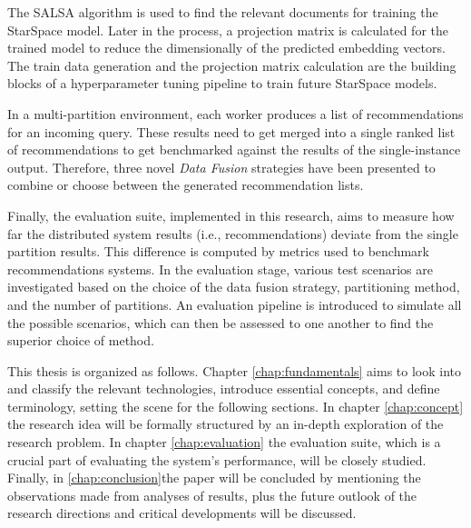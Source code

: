 The SALSA algorithm is used to find the relevant documents for training the StarSpace model. Later in the process, a projection matrix is calculated for the trained model to reduce the dimensionally of the predicted embedding vectors. The train data generation and the projection matrix calculation are the building blocks of a hyperparameter tuning pipeline to train future StarSpace models.


In a multi-partition environment, each worker produces a list of recommendations for an incoming query. These results need to get merged into a single ranked list of recommendations to get benchmarked against the results of the single-instance output. Therefore, three novel \emph{Data Fusion} strategies have been presented to combine or choose between the generated recommendation lists.


Finally, the evaluation suite, implemented in this research, aims to measure how far the distributed system results (i.e., recommendations) deviate from the single partition results. This difference is computed by metrics used to benchmark recommendations systems. In the evaluation stage, various test scenarios are investigated based on the choice of the data fusion strategy, partitioning method, and the number of partitions. An evaluation pipeline is introduced to simulate all the possible scenarios, which can then be assessed to one another to find the superior choice of method.


This thesis is organized as follows. Chapter \ref{chap:fundamentals} aims to look into and classify the relevant technologies, introduce essential concepts, and define terminology, setting the scene for the following sections. In chapter \ref{chap:concept} the research idea will be formally structured by an in-depth exploration of the research problem. In chapter \ref{chap:evaluation} the evaluation suite, which is a crucial part of evaluating the system's performance, will be closely studied. Finally, in \ref{chap:conclusion}the paper will be concluded by mentioning the observations made from analyses of results, plus the future outlook of the research directions and critical developments will be discussed.
